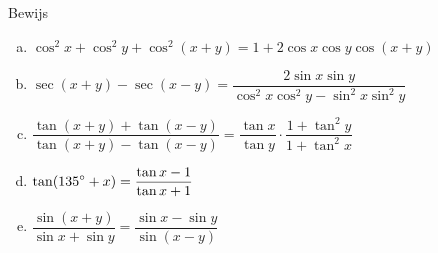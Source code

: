 \documentclass[a4paper,12pt]{article}
\begin{document}
\begin{oefening}
Bewijs
\begin{enumerate}[(a)]
\itemsep.5em
  \item $\displaystyle \cos^2 x + \cos^2 y + \cos^2(x+y) = 1 + 2\cos x \cos y \cos(x+y)$
  \item $\displaystyle \sec(x+y) - \sec(x-y) = \dfrac{2\sin x \sin y}{\cos^2 x \cos^2 y - \sin^2 x \sin^2 y}$
  \item $\displaystyle \dfrac{\tan(x+y) + \tan(x-y)}{\tan(x+y) - \tan(x-y)} = \dfrac{\tan x}{\tan y}\cdot\dfrac{1+\tan^2 y}{1 + \tan^2 x}$
  \item $\displaystyle \tan(135^\circ + x) = \dfrac{\tan x - 1}{\tan x + 1}$
  \item $\displaystyle \dfrac{\sin(x+y)}{\sin x + \sin y} = \dfrac{\sin x - \sin y}{\sin(x-y)}$
\end{enumerate}
\end{oefening}

\end{document}

